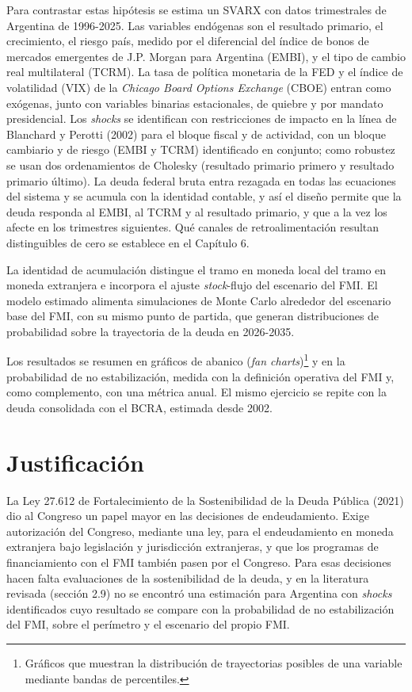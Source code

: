 Para contrastar estas hipótesis se estima un SVARX con datos
trimestrales de Argentina de 1996-2025. Las variables endógenas son el
resultado primario, el crecimiento, el riesgo país, medido por el
diferencial del índice de bonos de mercados emergentes de J.P. Morgan
para Argentina (EMBI), y el tipo de cambio real multilateral (TCRM). La
tasa de política monetaria de la FED y el índice de volatilidad (VIX) de
la \emph{Chicago Board Options Exchange} (CBOE) entran como exógenas,
junto con variables binarias estacionales, de quiebre y por mandato
presidencial. Los \emph{shocks} se identifican con restricciones de
impacto en la línea de Blanchard y Perotti (2002) para el bloque fiscal
y de actividad, con un bloque cambiario y de riesgo (EMBI y TCRM)
identificado en conjunto; como robustez se usan dos ordenamientos de
Cholesky (resultado primario primero y resultado primario último). La
deuda federal bruta entra rezagada en todas las ecuaciones del sistema y
se acumula con la identidad contable, y así el diseño permite que la
deuda responda al EMBI, al TCRM y al resultado primario, y que a la vez
los afecte en los trimestres siguientes. Qué canales de
retroalimentación resultan distinguibles de cero se establece en el
Capítulo 6.

La identidad de acumulación distingue el tramo en moneda local del tramo
en moneda extranjera e incorpora el ajuste \emph{stock}-flujo del
escenario del FMI. El modelo estimado alimenta simulaciones de Monte
Carlo alrededor del escenario base del FMI, con su mismo punto de
partida, que generan distribuciones de probabilidad sobre la trayectoria
de la deuda en 2026-2035.

Los resultados se resumen en gráficos de abanico (\emph{fan
charts})\footnote{Gráficos que muestran la distribución de trayectorias
  posibles de una variable mediante bandas de percentiles.} y en la
probabilidad de no estabilización, medida con la definición operativa
del FMI y, como complemento, con una métrica anual. El mismo ejercicio
se repite con la deuda consolidada con el BCRA, estimada desde 2002.

\section{Justificación}

La Ley 27.612 de Fortalecimiento de la Sostenibilidad de la Deuda
Pública (2021) dio al Congreso un papel mayor en las decisiones de
endeudamiento. Exige autorización del Congreso, mediante una ley, para
el endeudamiento en moneda extranjera bajo legislación y jurisdicción
extranjeras, y que los programas de financiamiento con el FMI también
pasen por el Congreso. Para esas decisiones hacen falta evaluaciones de
la sostenibilidad de la deuda, y en la literatura revisada (sección 2.9)
no se encontró una estimación para Argentina con \emph{shocks}
identificados cuyo resultado se compare con la probabilidad de no
estabilización del FMI, sobre el perímetro y el escenario del propio
FMI.

